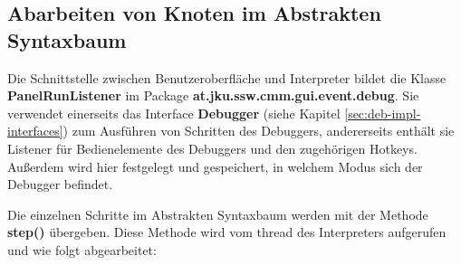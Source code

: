
\subsection{Abarbeiten von Knoten im Abstrakten Syntaxbaum}
Die Schnittstelle zwischen Benutzeroberfläche und Interpreter bildet die Klasse \textbf{PanelRunListener} im Package \textbf{at.jku.ssw.cmm.gui.event.debug}. Sie verwendet einerseits das Interface \textbf{Debugger} (siehe Kapitel \ref{sec:deb-impl-interfaces}) zum Ausführen von Schritten des Debuggers, andererseits enthält sie Listener für Bedienelemente des Debuggers und den zugehörigen Hotkeys. Außerdem wird hier festgelegt und gespeichert, in welchem Modus sich der Debugger befindet.

Die einzelnen Schritte im Abstrakten Syntaxbaum werden mit der Methode \textbf{step()} übergeben. Diese Methode wird vom thread des Interpreters aufgerufen und wie folgt abgearbeitet:

